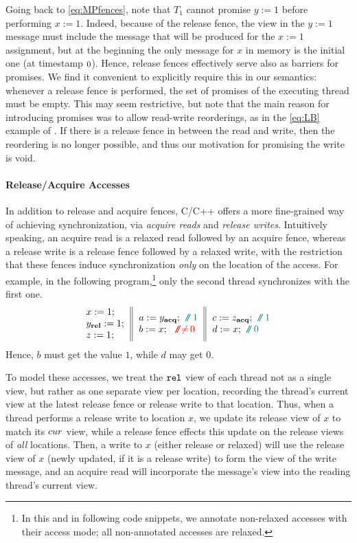 Going back to \ref{eq:MPfences}, note that $T_1$ cannot promise $y:=1$
before performing $x:=1$. Indeed, because of the release fence, the view in the $y:=1$ message must include the message
that will be produced for the $x:=1$ assignment, but at the beginning the only message for $x$ in memory is the initial one (at timestamp $\mbox{\small0}$).
Hence, release fences effectively serve also as barriers for promises.
We find it convenient to explicitly require this in our semantics: whenever a release fence is performed,
the set of promises of the executing thread must be empty.
This may seem restrictive, but note that the main reason for introducing promises was to allow read-write reorderings,
as in the \ref{eq:LB} example of .
If there is a release fence in between the read and write, then the reordering is no longer possible, and thus our motivation for promising the write is void.

\paragraph{Release/Acquire Accesses}

In addition to release and acquire fences, C/C++ offers a more fine-grained way
of achieving synchronization, via \emph{acquire reads} and \emph{release writes}.
Intuitively speaking, an acquire read is a relaxed read followed by an acquire fence,
whereas a release write is a release fence followed by a relaxed write,
with the restriction that these fences induce synchronization \emph{only} on the location of the access.
For example, in the following program,\footnote{In this and in following code snippets, we annotate non-relaxed accesses with their access mode; 
all non-annotated accesses are relaxed.} 
only the second thread synchronizes with the first one.
$$
\inarrIII{ x:=1 ;\\ y_{\relw}:=1;\\ z:=1; }
         { a:=y_{\acqr}; \comment{1} \\ b:=x; \nocomment{0} }
         { c:=z_{\acqr}; \comment{1} \\ d:=x; \comment{0} }
$$
Hence, $b$ must get the value $1$, while $d$ may get $0$.




To model these accesses, we treat the ${\texttt{rel}}$ view of each thread not as a single view,
but rather as one separate view per location, 
recording the thread's current view at the latest release fence or release write to that location.
Thus, when a thread performs a release write to location $x$, we update its release view of $x$ to match its $cur$ view,
while a release fence effects this update on the release views of \emph{all} locations.
Then, a write to $x$ (either release or relaxed) will use the release view of $x$ (newly updated, if it is a release write) to form the view of the write message, and an acquire read
will incorporate the message's view into the reading thread's current view.

